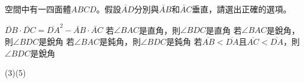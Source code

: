 \begin{QUESTIONS}
\begin{QUESTION}
\begin{QSOL}
    \end{QSOL}
    \begin{QEMPTYSPACE}
    \end{QEMPTYSPACE}
\end{QUESTION}
\begin{QUESTION}
    \begin{QBODY}
        空間中有一四面體$ABCD$。假設$\lvec{AD}$分別與$\lvec{AB}$和$\lvec{AC}$垂直，請選出正確的選項。
        \begin{QOPS}
            \QOP $\lvec{DB}\cdot\lvec{DC} ={{\overline{DA}}^{2}}- \lvec{AB}\cdot \lvec{AC}$
            \QOP 若$\angle BAC$是直角，則$\angle BDC$是直角
            \QOP 若$\angle BAC$是銳角，則$\angle BDC$是銳角
            \QOP 若$\angle BAC$是鈍角，則$\angle BDC$是鈍角
            \QOP 若$\overline{AB}<\overline{DA}$且$\overline{AC}<\overline{DA}$，則$\angle BDC$是銳角
        \end{QOPS}
    \end{QBODY}
    \begin{QFROMS}
    \end{QFROMS}
    \begin{QTAGS}
    \end{QTAGS}
    \begin{QANS}
        (3)(5)
    \end{QANS}
    \begin{QSOL}
    \end{QSOL}
    \begin{QEMPTYSPACE}
    \end{QEMPTYSPACE}
\end{QUESTION}
\end{QUESTIONS}
